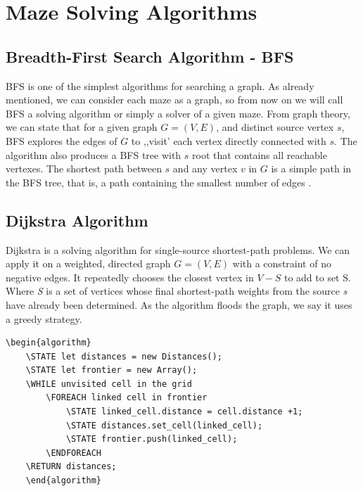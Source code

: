 \section{Maze Solving Algorithms}
\subsection{Breadth-First Search Algorithm - BFS}
BFS is one of the simplest algorithms for searching a graph. As already mentioned, we can consider each maze as a graph, so from now on we will call 
BFS  a solving algorithm or simply a solver of a given maze. From graph theory, we can state that for a given graph $ G = ( V, E) $, and distinct source 
vertex $s$, BFS explores the edges of $G$ to ,,visit’ each vertex directly connected with $s$. The algorithm also produces a BFS tree with $s$ root that 
contains all reachable vertexes. The shortest path  between $s$ and any vertex $v$ in $G$ is a simple path in the BFS tree, that is, a path containing
the smallest number of edges \cite{TCorm}.
\subsection{Dijkstra Algorithm}
Dijkstra is a solving algorithm for single-source shortest-path problems. We can apply it on a weighted, directed graph $G=(V, E)$ with a constraint of no negative edges. 
It repeatedly chooses the closest vertex in $V-S$ to add to set S. 
Where \textit{S} is a set of vertices whose final shortest-path weights from the source \textit{s} have already been determined.
As the algorithm floods the graph, we say it uses a greedy strategy.
\newline
\\
\begin{lstlisting}[caption={Pseudocode for a Dijkstra’s algorithm}]
	\begin{algorithm}
	\STATE let distances = new Distances();
	\STATE let frontier = new Array();
	\WHILE unvisited cell in the grid
		\FOREACH linked cell in frontier
			\STATE linked_cell.distance = cell.distance +1;
			\STATE distances.set_cell(linked_cell);
			\STATE frontier.push(linked_cell);
	    \ENDFOREACH
	\RETURN distances;
	\end{algorithm}
	\end{lstlisting}

